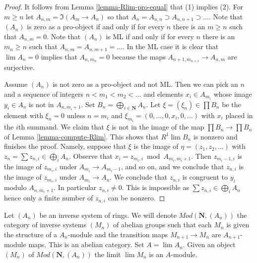 \begin{proof}
It follows from Lemma \ref{lemma-Rlim-pro-equal} that (1) implies (2).
For $m \geq n$ let $A_{n, m} = \Im(A_m \to A_n)$
so that $A_n = A_{n, n} \supset A_{n, n + 1} \supset \ldots$.
Note that $(A_n)$ is zero as a pro-object if and only if for every
$n$ there is an $m \geq n$ such that $A_{n, m} = 0$.
Note that $(A_n)$ is ML if and only if for every $n$ there is an $m_n \geq n$
such that $A_{n, m} = A_{n, m + 1} = \ldots$. In the ML case it is
clear that $\lim A_n = 0$ implies that $A_{n, m_n} = 0$
because the maps $A_{n + 1, m_{n + 1}} \to A_{n, m}$ are surjective.

\medskip\noindent
Assume $(A_n)$ is not zero as a pro-object and not ML.
Then we can pick an $n$ and a sequence
of integers $n < m_1 < m_2 < \ldots$ and elements
$x_i \in A_{m_i}$ whose image $y_i \in A_n$ is not in $A_{n, m_i + 1}$.
Set $B_n = \bigoplus_{i \in \mathbf{N}} A_n$.
Let $\xi = (\xi_n) \in \prod B_n$ be the element with
$\xi_n = 0$ unless $n = m_i$ and $\xi_{m_i} = (0, \ldots, 0, x_i, 0, \ldots)$
with $x_i$ placed in the $i$th summand. We claim that $\xi$ is not in the
image of the map $\prod B_n \to \prod B_n$ of Lemma \ref{lemma-compute-Rlim}.
This shows that $R^1\lim B_n$ is nonzero and finishes the proof.
Namely, suppose that $\xi$ is the image of $\eta = (z_1, z_2, \ldots)$
with $z_n = \sum z_{n, i} \in \bigoplus_i A_n$.
Observe that $x_i = z_{m_i, i} \bmod A_{m_i, m_i + 1}$.
Then $z_{m_i - 1, i}$ is the image of $z_{m_i, i}$ under
$A_{m_i} \to A_{m_i - 1}$, and so on, and we conclude that
$z_{n, i}$ is the image of $z_{m_i, i}$ under $A_{m_i} \to A_n$.
We conclude that $z_{n, i}$ is congruent to $y_i$ modulo
$A_{n, m_i + 1}$. In particular $z_{n, i} \not = 0$.
This is impossible as $\sum z_{n, i} \in \bigoplus_i A_n$
hence only a finite number of $z_{n, i}$ can be nonzero.
\end{proof}

\noindent
Let $(A_n)$ be an inverse system of rings. We will denote
$\textit{Mod}(\mathbf{N}, (A_n))$ the category of inverse systems
$(M_n)$ of abelian groups such that each $M_n$ is given the
structure of a $A_n$-module and the transition maps
$M_{n + 1} \to M_n$ are $A_{n + 1}$-module maps.
This is an abelian category. Set $A = \lim A_n$.
Given an object $(M_n)$ of $\textit{Mod}(\mathbf{N}, (A_n))$
the limit $\lim M_n$ is an $A$-module.

